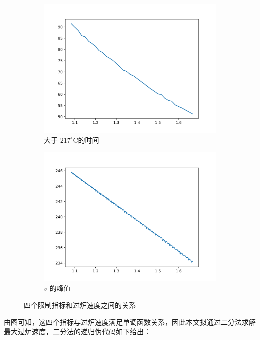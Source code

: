 \documentclass[../main.tex]{subfiles}
\begin{document}
\begin{figure}[H]
\begin{subfigure}[b]{0.4\textwidth}
		\centering
		\includegraphics[width=\textwidth]{217.pdf}
		\caption{大于 \(217 ^{\circ}\mathrm{C}\)的时间}
	\end{subfigure}
	\begin{subfigure}[b]{0.4\textwidth}
		\centering
		\includegraphics[width=\textwidth]{max.pdf}
		\caption{\(v\) 的峰值}
	\end{subfigure}
	\caption{四个限制指标和过炉速度之间的关系}\label{fig:four}
\end{figure}
由图可知，这四个指标与过炉速度满足单调函数关系，因此本文拟通过二分法求解最大过炉速度，二分法的递归伪代码如下给出：
\end{document}
